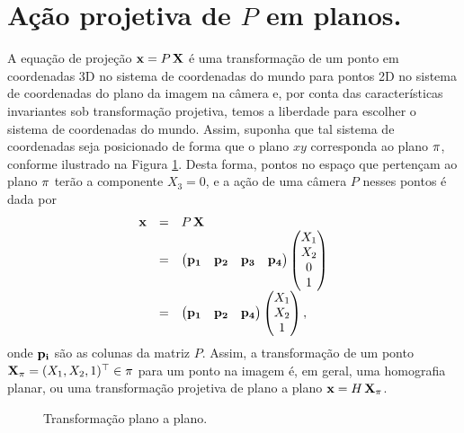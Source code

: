\section*{Ação projetiva de $P$ em planos.}
A equação de projeção $\mathbf{x}=P\,\mathbf{X}$ é uma transformação de um ponto em coordenadas 3D no sistema de coordenadas do mundo para pontos 2D no sistema de coordenadas do plano da imagem na câmera e, por conta das características invariantes sob transformação projetiva, temos a liberdade para escolher o sistema de coordenadas do mundo. Assim, suponha que tal sistema de coordenadas seja posicionado de forma que o plano $xy$ corresponda ao plano $\pi$, conforme ilustrado na Figura \ref{fig.projecao-planos-retas}. Desta forma, pontos no espaço que pertençam ao plano $\pi$ terão a componente $X_3=0$, e a ação de uma câmera $P$ nesses pontos é dada por
\begin{equation*}
\begin{array}{rcl}
\mathbf{x}&=&P\,\mathbf{X}\\
&=&
\begin{pmatrix}
{\bf p_1}&{\bf p_2}&{\bf p_3}&{\bf p_4}
\end{pmatrix}
\begin{pmatrix}
X_1\\
X_2\\
0\\
1
\end{pmatrix}\\
&=&
\begin{pmatrix}
{\bf p_1}&{\bf p_2}&{\bf p_4}
\end{pmatrix}
\begin{pmatrix}
X_1\\
X_2\\
1
\end{pmatrix},
\end{array}
\end{equation*}
onde ${\bf p_i}$ são as colunas da matriz $P$. Assim, a transformação de um ponto $\mathbf{X}_\pi=(X_1,X_2,1)^\top\in\pi$ para um ponto na imagem é, em geral, uma homografia planar, ou uma transformação projetiva de plano a plano $\mathbf{x}=H\,\mathbf{X}_\pi$.
\begin{figure}[htb!]{\textwidth}
\caption{Transformação plano a plano.}
\hfill
{}\hfill
{}
\label{fig.projecao-planos-retas}
\end{figure}
